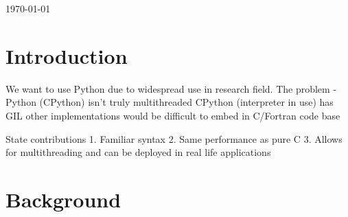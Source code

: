 \documentclass[12pt, a4paper]{report}
\begin{document}
\begin{titlepage}


{\large \today}\\[3cm] %




\vfill %
\end{titlepage}


\tableofcontents




\chapter{Introduction}\label{ch:intro}

We want to use Python due to widespread use in research field.
The problem - Python (CPython) isn't truly multithreaded
    CPython (interpreter in use) has GIL
        other implementations would be difficult to embed in C/Fortran code base

State contributions
    1. Familiar syntax
    2. Same performance as pure C
    3. Allows for multithreading and can be deployed in real life applications

\chapter{Background}\label{ch:bkg}
\end{document}
